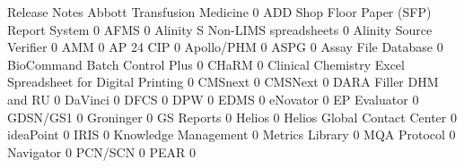 \documentclass{article}
\begin{document}
\begin{Schunk}
\begin{Soutput}
                                                            Release Notes
  Abbott Transfusion Medicine                                           0
  ADD Shop Floor Paper (SFP) Report System                              0
  AFMS                                                                  0
  Alinity S Non-LIMS spreadsheets                                       0
  Alinity Source Verifier                                               0
  AMM                                                                   0
  AP 24 CIP                                                             0
  Apollo/PHM                                                            0
  ASPG                                                                  0
  Assay File Database                                                   0
  BioCommand Batch Control Plus                                         0
  CHaRM                                                                 0
  Clinical Chemistry Excel Spreadsheet for Digital Printing             0
  CMSnext                                                               0
  CMSNext                                                               0
  DARA Filler DHM and RU                                                0
  DaVinci                                                               0
  DFCS                                                                  0
  DPW                                                                   0
  EDMS                                                                  0
  eNovator                                                              0
  EP Evaluator                                                          0
  GDSN/GS1                                                              0
  Groninger                                                             0
  GS Reports                                                            0
  Helios                                                                0
  Helios Global Contact Center                                          0
  ideaPoint                                                             0
  IRIS                                                                  0
  Knowledge Management                                                  0
  Metrics Library                                                       0
  MQA Protocol                                                          0
  Navigator                                                             0
  PCN/SCN                                                               0
  PEAR                                                                  0

\end{Soutput}
\end{Schunk}
\end{document}
